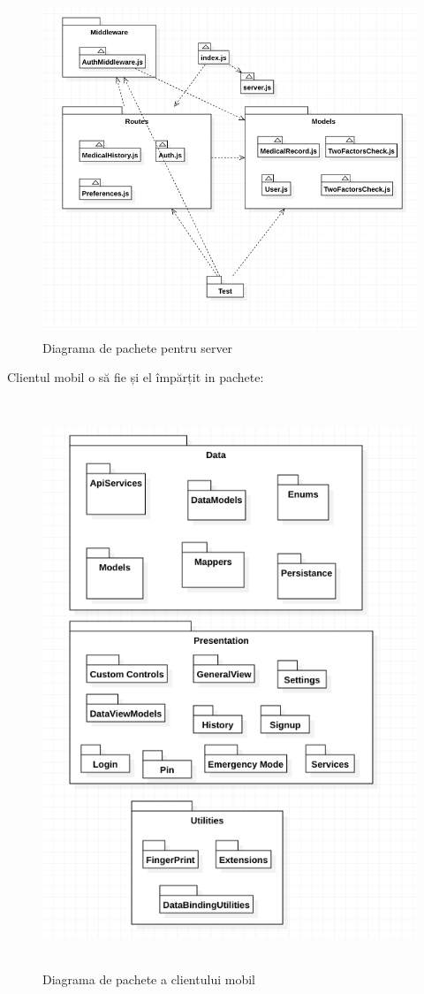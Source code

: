 \documentclass[12pt]{article}
\begin{document}
\begin{figure}[H]
    \centering
    \includegraphics[width=12cm, height=10cm]{pacheteserver.png}
    \caption{Diagrama de pachete pentru server}
    \end{figure}

\newpage
Clientul mobil o să fie și el împărțit in pachete:



\begin{figure}[H]
    \centering
    \includegraphics[width=14cm, height=17cm]{pacheteclient.png}
    \caption{Diagrama de pachete a clientului mobil}
    \end{figure}
\end{document}
